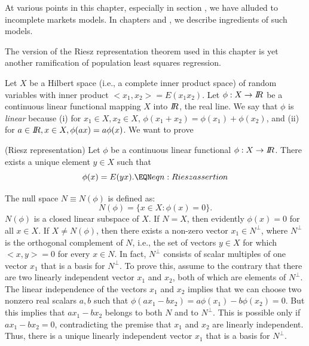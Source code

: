  At various points in this chapter, especially in section , we have alluded to
incomplete markets models.   In chapters  and
,
we describe ingredients of such models.



\label{appRiesz}%
The version of the {Riesz representation theorem}  used in this chapter is yet
another ramification of population least squares regression.

Let $X$ be a Hilbert space (i.e., a complete inner product space) of random variables  with inner product $<x_1, x_2> = E (x_1 x_2) $.
Let $\phi: X \rightarrow {{I\kern-0.3em R}}$ be a  continuous linear functional mapping $X$ into ${I\kern-0.3em R}$, the real line.
We say that $\phi$ is {\it linear} because
(i) for $x_1 \in X, x_2 \in X$, $\phi(x_1+ x_2 ) = \phi(x_1) + \phi(x_2)$, and   (ii) for $a \in {{I\kern-0.3em R}}, x\in X,
\phi(a x ) = a \phi(x)$.  We want to prove

%
  (Riesz representation)   Let $\phi$ be a continuous linear functional $\phi: X \rightarrow {I\kern-0.3em R}$. There exists a unique element
$y \in X$ such that
$$\phi(x) = E (yx) . \EQN eqn:Rieszassertion $$
\endtheorem

\proof
  The null space $N\equiv N(\phi)$ is defined as:
$$ N(\phi) = \bigl\{ x \in X: \phi(x) = 0 \bigr\} .$$
$N(\phi)$ is a closed linear subspace of $X$.  If $N = X$, then evidently  $\phi(x) =0 $ for all $x \in X$.  If $X \neq N(\phi)$,
then there exists a non-zero vector $x_1 \in N^\perp$, where $N^\perp$ is the orthogonal complement of $N$, i.e., the set of vectors $y \in X$
for which $<x, y> = 0$ for every $x \in N$.  In fact, $N^\perp$ consists of scalar multiples of one vector $x_1$  that is a basis for
$N^\perp$. To prove this, assume to the contrary that there are two linearly independent vector $x_1 $ and $x_2$, both of which are elements
of $N^\perp$.  The linear independence of the vectors $x_1$ and $x_2$  implies that we can choose two nonzero real scalars $a, b$ such that $\phi(ax_1 - b x_2 ) = a \phi(x_1) - b \phi(x_2) = 0$.
But this implies that $a x_1 - b x_2$ belongs to both $N$ and to $N^\perp$.  This is possible only if $a x_1 - b x_2 = 0$, contradicting the premise
that $x_1$ and $x_2$ are linearly independent.  Thus, there is a unique linearly independent vector $x_1$ that is a basis for $N^\perp$.


